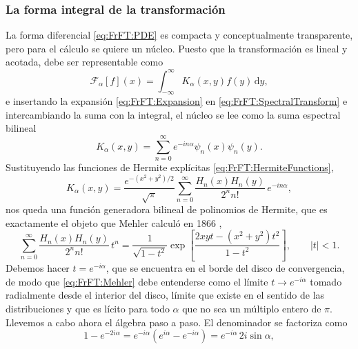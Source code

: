 		\subsubsection{La forma integral de la transformación}

			La forma diferencial \eqref{eq:FrFT:PDE} es compacta y conceptualmente transparente, pero para el cálculo se quiere un núcleo. Puesto que la transformación es lineal y acotada, debe ser representable como
			\begin{equation}\label{eq:FrFT:KernelDef}
				\mathcal{F}_{\alpha}[f](x) = \int_{-\infty}^{\infty}K_{\alpha}(x,y)f(y)\,\mathrm{d}y,
			\end{equation}
			e insertando la expansión \eqref{eq:FrFT:Expansion} en \eqref{eq:FrFT:SpectralTransform} e intercambiando la suma con la integral, el núcleo se lee como la suma espectral bilineal
			\begin{equation}\label{eq:FrFT:KernelSum}
				K_{\alpha}(x,y) = \sum_{n=0}^{\infty}e^{-in\alpha}\psi_{n}(x)\psi_{n}(y).
			\end{equation}
			Sustituyendo las funciones de Hermite explícitas \eqref{eq:FrFT:HermiteFunctions},
			\begin{equation}\label{eq:FrFT:KernelHermite}
				K_{\alpha}(x,y) = \frac{e^{-\left(x^{2}+y^{2}\right)/2}}{\sqrt{\pi}}\sum_{n=0}^{\infty}\frac{H_{n}(x)H_{n}(y)}{2^{n}n!}\,e^{-in\alpha},
			\end{equation}
			nos queda una función generadora bilineal de polinomios de Hermite, que es exactamente el objeto que Mehler calculó en 1866 \citep{mehler1866entwicklung},
			\begin{equation}\label{eq:FrFT:Mehler}
				\sum_{n=0}^{\infty}\frac{H_{n}(x)H_{n}(y)}{2^{n}n!}\,t^{n} = \frac{1}{\sqrt{1-t^{2}}}\exp\left[\frac{2xyt - \left(x^{2}+y^{2}\right)t^{2}}{1-t^{2}}\right], \qquad |t|<1.
			\end{equation}
			Debemos hacer $t = e^{-i\alpha}$, que se encuentra en el borde del disco de convergencia, de modo que \eqref{eq:FrFT:Mehler} debe entenderse como el límite $t\to e^{-i\alpha}$ tomado radialmente desde el interior del disco, límite que existe en el sentido de las distribuciones y que es lícito para todo $\alpha$ que no sea un múltiplo entero de $\pi$. Llevemos a cabo ahora el álgebra paso a paso. El denominador se factoriza como
			\begin{equation}\label{eq:FrFT:Denominator}
				1 - e^{-2i\alpha} = e^{-i\alpha}\left(e^{i\alpha} - e^{-i\alpha}\right) = e^{-i\alpha}\,2i\sin\alpha,
			\end{equation}
